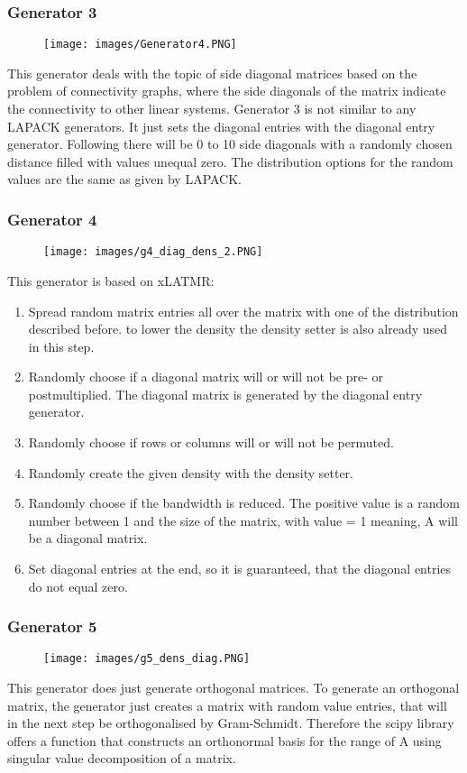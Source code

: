 \documentclass[parskip=full]{scrartcl}
\begin{document}
\newpage
\subsubsection{Generator 3}
\begin{figure}[h!]
	\texttt{[image: images/Generator4.PNG]}
\end{figure}
This generator deals with the topic of side diagonal matrices based on the problem of connectivity graphs, where the side diagonals of the matrix indicate the connectivity to other linear systems.
Generator 3 is not similar to any LAPACK generators. It just sets the diagonal entries with the diagonal entry generator. Following there will be 0 to 10 side diagonals with a randomly chosen distance filled with values unequal zero.
The distribution options for the random values are the same as given by LAPACK.

\newpage
\subsubsection{Generator 4}
\begin{figure}[h!]
	\texttt{[image: images/g4\_diag\_dens\_2.PNG]}
\end{figure}
This generator is based on xLATMR:
\begin{enumerate}
	\item Spread random matrix entries all over the matrix with one of the distribution described before. to lower the density the density setter is also already used in this step.
	\item Randomly choose if a diagonal matrix will or will not be pre- or postmultiplied. The diagonal matrix is generated by the diagonal entry generator.
	\item Randomly choose if rows or columns will or will not be permuted.
	\item Randomly create the given density with the density setter.
	\item Randomly choose if the bandwidth is reduced. The positive value is a random number between 1 and the size of the matrix, with value = 1 meaning, A will be a diagonal matrix.
	\item Set diagonal entries at the end, so it is guaranteed, that the diagonal entries do not equal zero.
\end{enumerate}

\newpage
\subsubsection{Generator 5}
\begin{figure}[h!]
	\texttt{[image: images/g5\_dens\_diag.PNG]}
\end{figure}
This generator does just generate orthogonal matrices. 
To generate an orthogonal matrix, the generator just creates a matrix with random value entries, that will in the next step be orthogonalised by Gram-Schmidt. Therefore the scipy library \cite{scipy} offers a function that constructs an orthonormal basis for the range of A using singular value decomposition of a matrix.
\end{document}
